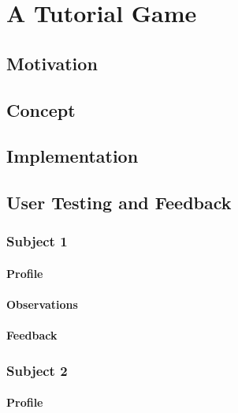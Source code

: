 \chapter{A Tutorial Game}
\label{ch:tutorial_game}



\section{Motivation}
\label{sec:game_motivation}


\section{Concept}
\label{sec:game_concept}


\section{Implementation}
\label{sec:game_implementation}


\section{User Testing and Feedback}
\label{sec:game_testing}


\subsection{Subject 1}
\label{game_testing_subject1}

\subsubsection{Profile}

\subsubsection{Observations}

\subsubsection{Feedback}


\subsection{Subject 2}
\label{game_testing_subject2}

\subsubsection{Profile}

